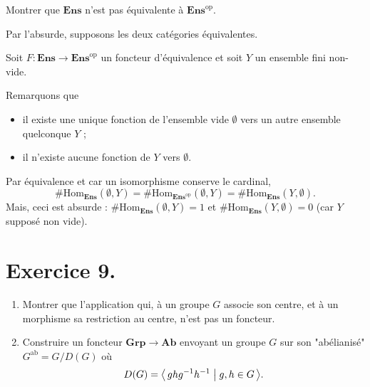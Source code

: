 \documentclass{../../td}
\begin{document}
  \begin{slshape}
    \color{deepblue}
    Montrer que $\mathbf{Ens}$ n'est pas équivalente à $\mathbf{Ens}^\mathrm{op}$.
  \end{slshape}

  Par l'absurde, supposons les deux catégories équivalentes.

  Soit $F : \mathbf{Ens} \to \mathbf{Ens}^\mathrm{op}$ un foncteur d'équivalence et soit $Y$ un ensemble fini non-vide.

  Remarquons que 
  \begin{itemize}
    \item il existe une unique fonction de l'ensemble vide $\emptyset$ vers un autre ensemble quelconque $Y$ ;
    \item il n'existe aucune fonction de $Y$ vers $\emptyset$.
  \end{itemize}

  Par équivalence et car un isomorphisme conserve le cardinal, 
  \[ \# \mathrm{Hom}_\mathbf{Ens}(\emptyset, Y) = \# \mathrm{Hom}_{\mathbf{Ens}^\mathrm{op}}(\emptyset,Y) = \# \mathrm{Hom}_\mathbf{Ens}(Y, \emptyset). \]
  Mais, ceci est absurde : $\# \mathrm{Hom}_\mathbf{Ens}(\emptyset,Y) = 1$ et $\# \mathrm{Hom}_\mathbf{Ens}(Y,\emptyset) = 0$ (car $Y$ supposé non vide).

  \chapter{Exercice 9.}

  \begin{slshape}
    \color{deepblue}
    \begin{enumerate}
      \item Montrer que l'application qui, à un groupe $G$ associe son centre, et à un morphisme sa restriction au centre, n'est pas un foncteur.
      \item Construire un foncteur $\mathbf{Grp} \to \mathbf{Ab}$ envoyant un groupe $G$ sur son "abélianisé" $G^\mathrm{ab} = G / D(G)$ où
        \[
        D(G) = \mleft\langle\, g h g^{-1} h^{-1}\;\middle|\; g,h \in G\,\mright\rangle 
        .\] 
    \end{enumerate}
  \end{slshape}
\end{document}
